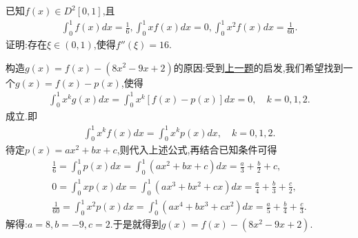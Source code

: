 \documentclass[lang=cn,newtx,10pt,scheme=chinese]{elegantbook}
\begin{document}
\begin{example}
已知$f(x)\in D^2[0,1]$,且
\begin{align*}
\int_0^1{f\left( x \right) dx}=\frac{1}{6},\int_0^1{xf\left( x \right) dx}=0,\int_0^1{x^2f\left( x \right) dx}=\frac{1}{60}.
\end{align*}
证明:存在$\xi \in (0,1)$,使得$f''(\xi)=16$.
\end{example}
\begin{note}
构造$g(x)=f(x)-(8x^2 - 9x + 2)$的原因:受到\hyperref[example245574]{上一题}的启发,我们希望找到一个$g(x)=f(x)-p(x)$,使得
\begin{align*}
\int_0^1 x^k g(x)dx =\int_0^1 x^k [f(x)-p(x)]dx = 0, \quad k = 0,1,2.
\end{align*}
成立.即
\begin{align*}
\int_0^1{x^kf(x)dx}=\int_0^1{x^kp(x)dx},\quad k=0,1,2.
\end{align*}
待定$p(x)=ax^2+bx+c$,则代入上述公式,再结合已知条件可得
\begin{gather*}
\frac{1}{6}=\int_0^1{p(x)dx}=\int_0^1{\left( ax^2+bx+c \right) dx}=\frac{a}{3}+\frac{b}{2}+c,
\\
0=\int_0^1{xp(x)dx}=\int_0^1{\left( ax^3+bx^2+cx \right) dx}=\frac{a}{4}+\frac{b}{3}+\frac{c}{2},
\\
\frac{1}{60}=\int_0^1{x^2p(x)dx}=\int_0^1{\left( ax^4+bx^3+cx^2 \right) dx}=\frac{a}{5}+\frac{b}{4}+\frac{c}{3}.
\end{gather*}
解得:$a=8,b=-9,c=2$.于是就得到\(g(x)=f(x)-(8x^2 - 9x + 2)\).
\end{note}
\end{document}
